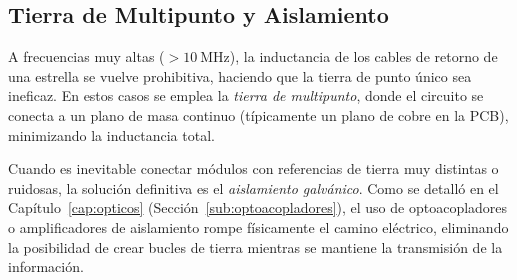 \begin{marginfigure}
    \centering
    \caption[Esquema de un bucle de tierra.]{Bucle de tierra. Al conectar la masa en dos puntos distantes, se crea un área que captura el flujo magnético externo, induciendo una tensión de ruido que contamina la referencia del sistema.}\label{fig:bucle_tierra}
\end{marginfigure}

\subsection{Tierra de Multipunto y Aislamiento}\label{sub:tierra_multipunto}

A frecuencias muy altas ($>\SI{10}{\mega\hertz}$), la inductancia de los cables de retorno de una estrella se vuelve prohibitiva, haciendo que la tierra de punto único sea ineficaz. En estos casos se emplea la \emph{tierra de multipunto}, donde el circuito se conecta a un plano de masa continuo (típicamente un plano de cobre en la PCB), minimizando la inductancia total.

Cuando es inevitable conectar módulos con referencias de tierra muy distintas o ruidosas, la solución definitiva es el \emph{aislamiento galvánico}. Como se detalló en el Capítulo~\ref{cap:opticos} (Sección~\ref{sub:optoacopladores}), el uso de optoacopladores o amplificadores de aislamiento rompe físicamente el camino eléctrico, eliminando la posibilidad de crear bucles de tierra mientras se mantiene la transmisión de la información.


